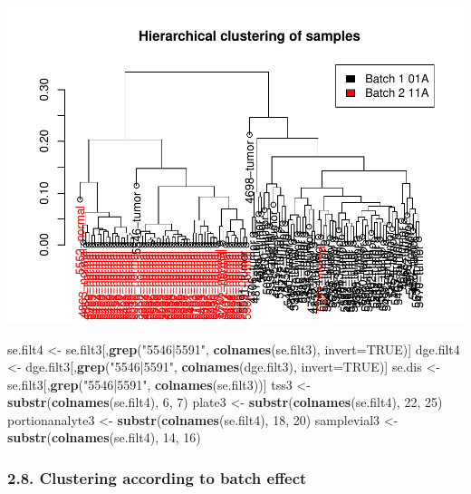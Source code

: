 \documentclass[]{article}
\newenvironment{Shaded}{\begin{snugshade}}{\end{snugshade}}
\newcommand{\KeywordTok}[1]{\textcolor[rgb]{0.13,0.29,0.53}{\textbf{{#1}}}}
\newcommand{\DataTypeTok}[1]{\textcolor[rgb]{0.13,0.29,0.53}{{#1}}}
\newcommand{\DecValTok}[1]{\textcolor[rgb]{0.00,0.00,0.81}{{#1}}}
\newcommand{\StringTok}[1]{\textcolor[rgb]{0.31,0.60,0.02}{{#1}}}
\newcommand{\OtherTok}[1]{\textcolor[rgb]{0.56,0.35,0.01}{{#1}}}
\newcommand{\NormalTok}[1]{{#1}}
\begin{document}
\includegraphics{IEO_project_files/figure-latex/Hierarchical clustering according to batch effect-3.pdf}

\begin{Shaded}
\begin{Highlighting}[]
\NormalTok{se.filt4 <-}\StringTok{ }\NormalTok{se.filt3[,}\KeywordTok{grep}\NormalTok{(}\StringTok{"5546|5591"}\NormalTok{, }\KeywordTok{colnames}\NormalTok{(se.filt3), }\DataTypeTok{invert=}\OtherTok{TRUE}\NormalTok{)]}
\NormalTok{dge.filt4 <-}\StringTok{ }\NormalTok{dge.filt3[,}\KeywordTok{grep}\NormalTok{(}\StringTok{"5546|5591"}\NormalTok{, }\KeywordTok{colnames}\NormalTok{(dge.filt3), }\DataTypeTok{invert=}\OtherTok{TRUE}\NormalTok{)]}
\NormalTok{se.dis <-}\StringTok{ }\NormalTok{se.filt3[,}\KeywordTok{grep}\NormalTok{(}\StringTok{"5546|5591"}\NormalTok{, }\KeywordTok{colnames}\NormalTok{(se.filt3))]}
\NormalTok{tss3 <-}\StringTok{ }\KeywordTok{substr}\NormalTok{(}\KeywordTok{colnames}\NormalTok{(se.filt4), }\DecValTok{6}\NormalTok{, }\DecValTok{7}\NormalTok{)}
\NormalTok{plate3 <-}\StringTok{ }\KeywordTok{substr}\NormalTok{(}\KeywordTok{colnames}\NormalTok{(se.filt4), }\DecValTok{22}\NormalTok{, }\DecValTok{25}\NormalTok{)}
\NormalTok{portionanalyte3 <-}\StringTok{ }\KeywordTok{substr}\NormalTok{(}\KeywordTok{colnames}\NormalTok{(se.filt4), }\DecValTok{18}\NormalTok{, }\DecValTok{20}\NormalTok{)}
\NormalTok{samplevial3 <-}\StringTok{ }\KeywordTok{substr}\NormalTok{(}\KeywordTok{colnames}\NormalTok{(se.filt4), }\DecValTok{14}\NormalTok{, }\DecValTok{16}\NormalTok{)}
\end{Highlighting}
\end{Shaded}

\subsubsection{2.8. Clustering according to batch
effect}\label{clustering-according-to-batch-effect-1}
\end{document}
